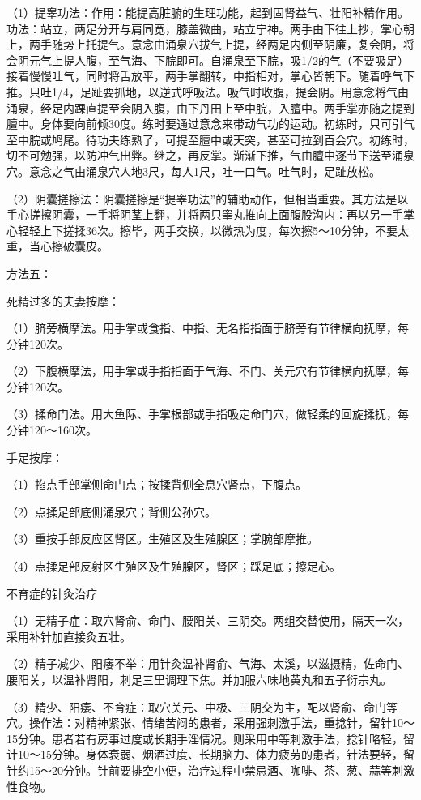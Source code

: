 \documentclass[12pt,UTF8,openany]{ctexbook}
\begin{document}
（1）提睾功法：作用：能提高脏腑的生理功能，起到固肾益气、壮阳补精作用。功法：站立，两足分开与肩同宽，膝盖微曲，站立宁神。两手由下往上抄，掌心朝上，两手随势上托提气。意念由涌泉穴拔气上提，经两足内侧至阴廉，复会阴，将会阴元气上提人腹，至气海、下脘即可。自涌泉至下脘，吸1/2的气（不要吸足）接着慢慢吐气，同时将舌放平，两手掌翻转，中指相对，掌心皆朝下。随着呼气下推。只吐1/4，足趾要抓地，以逆式呼吸法。吸气时收腹，提会阴。用意念将气由涌泉，经足内踝直提至会阴入腹，由下丹田上至中脘，入膻中。两手掌亦随之提到膻中。身体要向前倾30度。练时要通过意念来带动气功的运动。初练时，只可引气至中脘或鸠尾。待功夫练熟了，可提至膻中或天突，甚至可拉到百会穴。初练时，切不可勉强，以防冲气出弊。继之，再反掌。渐渐下推，气由膻中逐节下送至涌泉穴。意念之气由涌泉穴人地3尺，每人1尺，吐一口气。吐气时，足趾放松。

（2）阴囊搓擦法：阴囊搓擦是“提睾功法”的辅助动作，但相当重要。其方法是以手心搓擦阴囊，一手将阴茎上翻，并将两只睾丸推向上面腹股沟内：再以另一手掌心轻轻上下搓揉36次。擦毕，两手交换，以微热为度，每次擦5～10分钟，不要太重，当心擦破囊皮。

方法五：

死精过多的夫妻按摩：

（1）脐旁横摩法。用手掌或食指、中指、无名指指面于脐旁有节律横向抚摩，每分钟120次。

（2）下腹横摩法，用手掌或手指指面于气海、不门、关元穴有节律横向抚摩，每分钟120次。

（3）揉命门法。用大鱼际、手掌根部或手指吸定命门穴，做轻柔的回旋揉抚，每分钟120～160次。

手足按摩：

（1）掐点手部掌侧命门点；按揉背侧全息穴肾点，下腹点。

（2）点揉足部底侧涌泉穴；背侧公孙穴。

（3）重按手部反应区肾区。生殖区及生殖腺区；掌腕部摩推。

（4）点揉足部反射区生殖区及生殖腺区，肾区；踩足底；擦足心。





不育症的针灸治疗


（1）无精子症：取穴肾俞、命门、腰阳关、三阴交。两组交替使用，隔天一次，采用补针加直接灸五壮。

（2）精子减少、阳痿不举：用针灸温补肾俞、气海、太溪，以滋摄精，佐命门、腰阳关，以温补肾阳，刺足三里调理下焦。并加服六味地黄丸和五子衍宗丸。

（3）精少、阳痿、不育症：取穴关元、中极、三阴交为主，配以肾俞、命门等穴。操作法：对精神紧张、情绪苦闷的患者，采用强刺激手法，重捻针，留针10～15分钟。患者若有房事过度或长期手淫情况。则采用中等刺激手法，捻针略轻，留计10～15分钟。身体衰弱、烟酒过度、长期脑力、体力疲劳的患者，针法要轻，留针约15～20分钟。针前要排空小便，治疗过程中禁忌酒、咖啡、茶、葱、蒜等刺激性食物。
\end{document}
